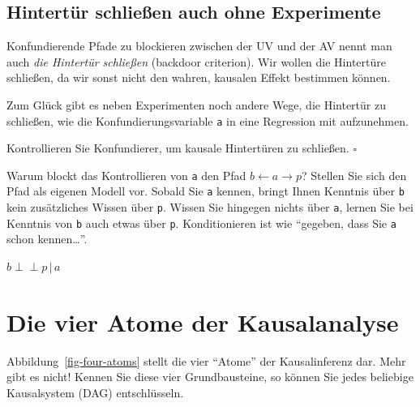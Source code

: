 \documentclass[
  ngerman,
  letterpaper,
  twoside,
  open=any]{scrbook}
\theoremstyle{definition}
\theoremstyle{plain}
\theoremstyle{definition}
\theoremstyle{definition}
\theoremstyle{definition}
\theoremstyle{definition}
\theoremstyle{remark}
\begin{document}
\subsection{Hintertür schließen auch ohne
Experimente}\label{hintertuxfcr-schlieuxdfen-auch-ohne-experimente}

Konfundierende Pfade zu blockieren zwischen der UV und der AV nennt man
auch \emph{die Hintertür schließen} (backdoor criterion). Wir wollen die
Hintertüre schließen, da wir sonst nicht den wahren, kausalen Effekt
bestimmen können.

Zum Glück gibt es neben Experimenten noch andere Wege, die Hintertür zu
schließen, wie die Konfundierungsvariable \texttt{a} in eine Regression
mit aufzunehmen.

\begin{tcolorbox}[enhanced jigsaw, arc=.35mm, bottomrule=.15mm, bottomtitle=1mm, breakable, colback=white, colbacktitle=quarto-callout-tip-color!10!white, colframe=quarto-callout-tip-color-frame, coltitle=black, left=2mm, leftrule=.75mm, opacityback=0, opacitybacktitle=0.6, rightrule=.15mm, title=\textcolor{quarto-callout-tip-color}{\faLightbulb}\hspace{0.5em}{Tipp}, titlerule=0mm, toprule=.15mm, toptitle=1mm]

Kontrollieren Sie Konfundierer, um kausale Hintertüren zu schließen.
\(\square\)

\end{tcolorbox}

Warum blockt das Kontrollieren von \texttt{a} den Pfad
\(b \leftarrow a \rightarrow p\)? Stellen Sie sich den Pfad als eigenen
Modell vor. Sobald Sie \texttt{a} kennen, bringt Ihnen Kenntnis über
\texttt{b} kein zusätzliches Wissen über \texttt{p}. Wissen Sie hingegen
nichts über \texttt{a}, lernen Sie bei Kenntnis von \texttt{b} auch
etwas über \texttt{p}. Konditionieren ist wie \enquote{gegeben, dass Sie
\texttt{a} schon kennen\ldots{}}.

\(b \perp \!\!\! \perp p \,|\,a\)

\section{Die vier Atome der
Kausalanalyse}\label{die-vier-atome-der-kausalanalyse}

Abbildung~\ref{fig-four-atoms} stellt die vier \enquote{Atome} der
Kausalinferenz dar. Mehr gibt es nicht! Kennen Sie diese vier
Grundbausteine, so können Sie jedes beliebige Kausalsystem (DAG)
entschlüsseln.
\end{document}
